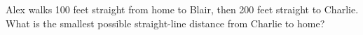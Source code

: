 Alex walks 100 feet straight from home to Blair, then 200 feet straight to Charlie. What is the smallest possible straight-line distance from Charlie to home?

